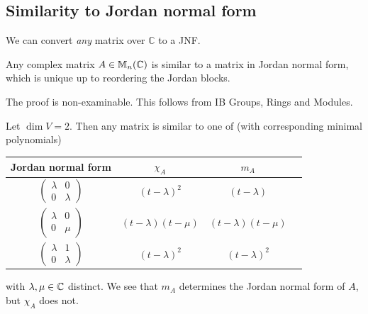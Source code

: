 \documentclass[a4paper]{article}
\begin{document}
\subsection{Similarity to Jordan normal form}
We can convert \textit{any} matrix over $\mathbb{C}$ to a JNF. 
\begin{theorem}
	Any complex matrix \( A \in {\mathbb{M}}_n(\mathbb C) \) is similar to a matrix in Jordan normal form, which is unique up to reordering the Jordan blocks.
\end{theorem}

The proof is non-examinable.
This follows from IB Groups, Rings and Modules.

\begin{example}
	Let \( \dim V = 2 \).
	Then any matrix is similar to one of (with corresponding minimal polynomials) 
	\begin{center}
		\begin{tabular}{cccc}
		  \toprule
		  Jordan normal form & $\chi_A$ & $m_A$\\
		  \midrule
		  $\begin{pmatrix} \lambda & 0\\ 0 & \lambda \end{pmatrix}$ & $(t - \lambda)^2$ & $(t - \lambda)$\\\addlinespace
		  $\begin{pmatrix} \lambda & 0\\ 0 & \mu \end{pmatrix}$ & $(t - \lambda)(t - \mu)$ & $(t - \lambda)(t - \mu)$\\\addlinespace
		  $\begin{pmatrix} \lambda & 1\\ 0 & \lambda \end{pmatrix}$ & $(t - \lambda)^2$ & $(t - \lambda)^2$\\
		  \bottomrule
		\end{tabular}
	  \end{center}
	  with $\lambda, \mu \in {\mathbb{C}}$ distinct. We see that $m_A$ determines the Jordan normal form of $A$, but $\chi_A$ does not.
\end{example}
\end{document}
